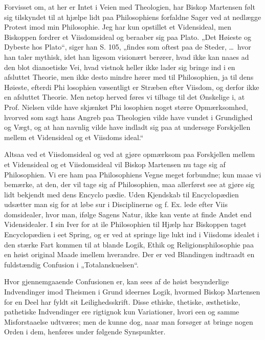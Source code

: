 \documentclass[12pt]{book}
\newcommand{\opage}[1]{\marginnote{\footnotesize\textit{[#1]}}}
\begin{document}
Forvisset om, at her er Intet i Veien med Theologien,
har Biskop Martensen følt sig tilskyndet til at hjælpe lidt
paa Philosophiens forfaldne Sager ved at nedlægge Protest
imod min Philosophie. Jeg har kun opstillet et Vidensideal,
men Biskoppen fordrer et Viisdomsideal og beraaber sig paa
Plato. „Det Høieste og Dybeste hos Plato“, siger han S.
105, „findes som oftest paa de Steder, \dots\ hvor han taler
\opage{117}\setcounter{footnote}{0}%
mythisk, idet han ligesom visionært berører, hvad ikke kan
naaes ad den blot dianoetiske Vei, hvad vistnok heller ikke lader
sig bringe ind i en afsluttet Theorie, men ikke desto mindre
hører med til Philosophien, ja til dens Høieste, efterdi Phi\-%
losophien væsentligt er Stræben efter Viisdom, og derfor
ikke en afsluttet Theorie. Men netop herved føres vi tilbage
til det Ønskelige i, at Prof. Nielsen vilde have skjænket Phi\-%
losophien noget større Opmærksomhed, hvorved som sagt hans
Angreb paa Theologien vilde have vundet i Grundighed og
Vægt, og at han navnlig vilde have indladt sig paa at
undersøge Forskjellen mellem et Vidensideal og et Viisdoms\-%
ideal.“

Altsaa ved et Viisdomsideal og ved at gjøre opmærksom
paa Forskjellen mellem et Vidensideal og et Viisdomsideal
vil Biskop Martensen nu tage sig af Philosophien. Vi ere
ham paa Philosophiens Vegne meget forbundne; kun maae
vi bemærke, at den, der vil tage sig af Philosophien, maa
allerførst see at gjøre sig lidt bekjendt med dens Encyclo\-%
pædie. Uden Kjendskab til Encyclopædien udsætter man sig
for at løbe sur i Disciplinerne og f. Ex. lede efter Viis\-%
domsidealer, hvor man, ifølge Sagens Natur, ikke kan vente
at finde Andet end Vidensidealer. I sin Iver for at ile
Philosophien til Hjælp har Biskoppen taget Encyclopædien
i eet Spring, og er ved at springe lige lukt ind i Viisdoms\-%
idealet i den stærke Fart kommen til at blande Logik,
Ethik og Religionsphilosophie paa en høist original Maade
imellem hverandre. Der er ved Blandingen indtraadt en
fuldstændig Confusion i „Totalanskuelsen“.

Hvor gjennemgaaende Confusionen er, kan sees af de
høist besynderlige Indvendinger imod Theismen i Grund\-%
ideernes Logik, hvormed Biskop Martensen for en Deel har
fyldt sit Leilighedsskrift. Disse ethiske, thetiske, æsthetiske,
pathetiske Indvendinger ere rigtignok kun Variationer, hvori
een og samme Misforstaaelse udtværes; men de kunne dog,
\opage{118}\setcounter{footnote}{0}%
naar man forsøger at bringe nogen Orden i dem, henføres
under følgende Synspunkter.
\end{document}
